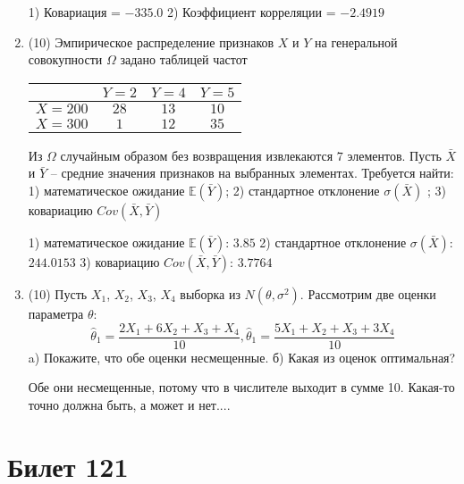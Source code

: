 \documentclass[a4paper,12pt]{article}
\begin{document}
\begin{enumerate}
1) Ковариация = $-335.0$
2) Коэффициент корреляции = $-2.4919$


\item


(10) Эмпирическое распределение признаков $X$ и $Y$ на генеральной совокупности $\Omega$ задано таблицей частот  
 
\begin{tabular}{ | c | c | c | c | }
\hline
 & $Y = 2$ & $Y = 4$ & $Y = 5$  \\ \hline
$X = 200$ & $28$ & $13$ & $10$\\ \hline
$X = 300$ & $1$ & $12$ & $35$\\
\hline
\end{tabular}

Из $\Omega$ случайным образом без возвращения извлекаются $7$ элементов. 
Пусть $\bar X$ и $\bar Y$ – средние значения признаков на выбранных элементах. 
Требуется найти: 1) математическое ожидание $\mathbb{E}(\bar Y)$; 2) стандартное отклонение $\sigma(\bar X)$ ; 
3) ковариацию $Cov(\bar X, \bar Y)$




1) математическое ожидание $\mathbb{E}(\bar Y)$: $3.85$ 
2) стандартное отклонение $\sigma(\bar X)$: $244.0153$
3) ковариацию $Cov(\bar X, \bar Y)$: $3.7764$


\item


(10) Пусть $X _{1}$, $X _{2}$, $X _{3}$, $X _{4}$ выборка из $N(\theta, \sigma ^{2})$. Рассмотрим две оценки параметра $\theta$:
\[\hat \theta _{1} = \frac{2X _{1} + 6X _{2} + X _{3} + X _{4}}{10}, \hat \theta _{1} = \frac{5X _{1} + X _{2} + X _{3} + 3X _{4}}{10}\]
a) Покажите, что обе оценки несмещенные.
б) Какая из оценок оптимальная?




Обе они несмещенные, потому что в числителе выходит в сумме 10.
Какая-то точно должна быть, а может и нет....



\end{enumerate}

\section{Билет 121}
\end{document}
